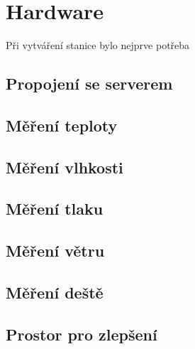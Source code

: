 \section{Hardware}
Při vytváření stanice bylo nejprve potřeba 
\subsection{Propojení se serverem}

\subsection{Měření teploty}

\subsection{Měření vlhkosti}

\subsection{Měření tlaku}

\subsection{Měření větru}

\subsection{Měření deště}

\subsection{Prostor pro zlepšení}
